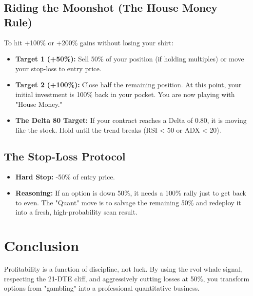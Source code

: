 \documentclass[11pt,a4paper]{article}
\begin{document}
\subsection{Riding the Moonshot (The House Money Rule)}
To hit +100\% or +200\% gains without losing your shirt:
\begin{itemize}
    \item \textbf{Target 1 (+50\%):} Sell 50\% of your position (if holding multiples) or move your stop-loss to entry price.
    \item \textbf{Target 2 (+100\%):} Close half the remaining position. At this point, your initial investment is 100\% back in your pocket. You are now playing with "House Money."
    \item \textbf{The Delta 80 Target:} If your contract reaches a Delta of 0.80, it is moving like the stock. Hold until the trend breaks (RSI < 50 or ADX < 20).
\end{itemize}

\subsection{The Stop-Loss Protocol}
\begin{itemize}
    \item \textbf{Hard Stop:} -50\% of entry price.
    \item \textbf{Reasoning:} If an option is down 50\%, it needs a 100\% rally just to get back to even. The "Quant" move is to salvage the remaining 50\% and redeploy it into a fresh, high-probability scan result.
\end{itemize}

\section{Conclusion}
Profitability is a function of discipline, not luck. By using the rvol whale signal, respecting the 21-DTE cliff, and aggressively cutting losses at 50\%, you transform options from "gambling" into a professional quantitative business.
\end{document}
